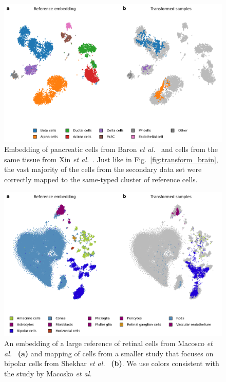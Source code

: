 \documentclass[runningheads]{llncs}
\newcommand{\etal}{\textit{et al.}}
\begin{document}
\begin{figure}[htb]
  \includegraphics[width=\textwidth]{transform_pancreas.pdf}
  \caption{Embedding of pancreatic cells from Baron \etal~\cite{Baron2016} and
  cells from the same tissue from Xin \etal~\cite{Xin2016}. Just like in
  Fig.~\ref{fig:transform_brain}, the vast majority of the cells from the
  secondary data set were correctly mapped to the same-typed cluster of
  reference cells.}
  \label{fig:transform_pancreas}
\end{figure}


\begin{figure}[htb]
  \includegraphics[width=\textwidth]{transform_retina.pdf}
  \caption{An embedding of a large reference of retinal cells from Macosco
  \etal~\cite{Macosko2015} \textbf{(a)} and mapping of cells from a smaller study that
  focuses on bipolar cells from Shekhar \etal~\cite{Shekhar2016} \textbf{(b)}. We use
  colors consistent with the study by Macosko \etal}
  \label{fig:transform_retina}
\end{figure}
\end{document}
